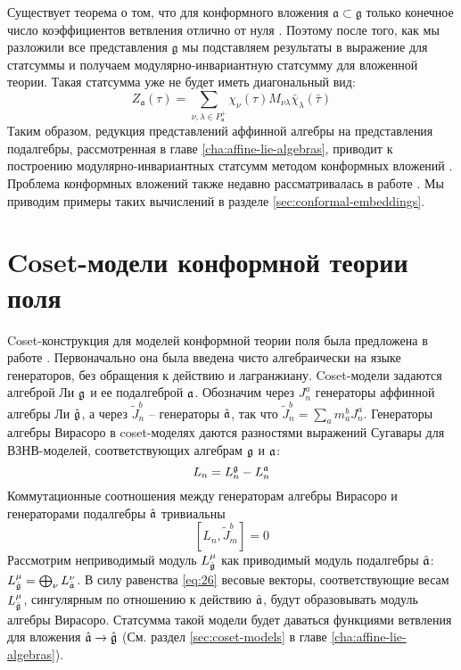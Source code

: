 Существует теорема о том, что для конформного вложения  $\mathfrak{a}\subset\mathfrak{g}$ только
конечное число коэффициентов ветвления отлично от нуля \cite{kac1988modular,altschuler1990branching}. Поэтому после того, как мы разложили все
представления $\mathfrak{g}$ мы подставляем результаты в выражение для статсуммы и получаем
модулярно-инвариантную статсумму для вложенной теории. Такая статсумма уже не будет иметь
диагональный вид:
\begin{equation}
  \label{eq:36}
   Z_{\mathfrak{a}}(\tau)=\sum_{ \nu,\lambda\in P^{+}_{\mathfrak{a}}} \chi_{\nu}(\tau)M_{\nu\lambda}\bar \chi_{\lambda}(\bar \tau)
\end{equation}
Таким образом, редукция представлений аффинной алгебры на представления подалгебры, рассмотренная в главе \ref{cha:affine-lie-algebras}, приводит к построению модулярно-инвариантных статсумм методом конформных вложений \cite{walton1989conformal}. Проблема конформных вложений также недавно рассматривалась в работе \cite{coquereaux2008conformal}.  Мы приводим примеры таких вычислений в разделе \ref{sec:conformal-embeddings}.

\section{Coset-модели конформной теории поля}
\label{sec:coset-models-cft}


Coset-конструкция для моделей конформной теории поля была предложена в работе \cite{Goddard198588}. Первоначально она была введена чисто алгебраически на языке генераторов, без обращения к действию и лагранжиану.  Coset-модели задаются алгеброй Ли $\mathfrak{g}$ и ее подалгеброй $\mathfrak{a}$. Обозначим через $J_{n}^{a}$ генераторы аффинной алгебры Ли $\hat{\mathfrak{g}}$, а через $\tilde{J}_{n}^{b}$ -- генераторы $\hat{\mathfrak{a}}$, так что $\tilde{J}^{b}_{n}=\sum_{a} m_{a}^{b} J^{a}_{n}$. Генераторы алгебры Вирасоро в coset-моделях даются разностями выражений Сугавары для ВЗНВ-моделей, соответствующих алгебрам  $\mathfrak{g}$ и $\mathfrak{a}$:
\begin{equation*}
  L_{n}=L_{n}^{\mathfrak{g}}-L_{n}^{\mathfrak{a}}
\end{equation*}
Коммутационные соотношения между генераторам алгебры Вирасоро и генераторами подалгебры  $\hat{\mathfrak{a}}$ тривиальны
\begin{equation}
  \label{eq:26}
  \left[L_{n},\tilde{J}^{b}_{m}\right]=0
\end{equation}
Рассмотрим неприводимый модуль $L^{\mu}_{\hat{\mathfrak{g}}}$ как приводимый модуль подалгебры $\hat{\mathfrak{a}}$: $L^{\mu}_{\hat{\mathfrak{g}}}=\bigoplus_{\nu}L^{\nu}_{\hat{\mathfrak{a}}}$.  В силу  равенства \eqref{eq:26} весовые векторы, соответствующие весам $L^{\mu}_{\hat{\mathfrak{g}}}$, сингулярным по отношению к действию $\hat{\mathfrak{a}}$, будут образовывать модуль алгебры Вирасоро. Статсумма такой модели будет даваться функциями ветвления для вложения $\hat{\mathfrak{a}}\to\hat{\mathfrak{g}}$ (См. раздел \ref{sec:coset-models} в главе \ref{cha:affine-lie-algebras}). 

